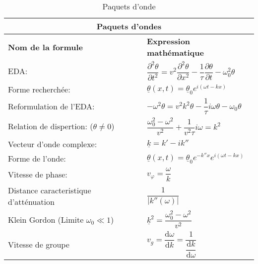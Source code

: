 \documentclass[10pt,a4paper,titlepage,portrait]{article}
\renewcommand{\d}
{
    \mathrm{d}
}
\newcommand*{\dv}[2]
{
    \dfrac{\d#1}{\d#2}
}
\newcommand*{\dpv}[2]
{
    \dfrac{\partial#1}{\partial#2}
}
\newcommand*{\ddpv}[2]
{
    \dfrac{\partial^2#1}{\partial{#2}^2}
}
\renewcommand{\arraystretch}{2}
\begin{document}
\begin{center}
\begin{table}[ht]
    \centering
    \renewcommand{\arraystretch}{1.5} %
    \setlength{\tabcolsep}{8pt} %
    \begin{tabular}{@{}p{9cm}p{10cm}@{}}
        \toprule
        \multicolumn{2}{c}{\textbf{Paquets d'ondes}} \\
        \midrule
        \textbf{Nom de la formule} & \textbf{Expression mathématique} \\
        \midrule
        EDA: & $\ddpv{\theta}{t}=v^2\ddpv{\theta}{x}-\dfrac{1}{\tau}\dpv{\theta}{t}-\omega_0^2\theta$ \\
        Forme recherchée: & $\underline{\theta}(x,t)=\underline{\theta}_0e^{i(\omega t-kx)}$\\
        Reformulation de l'EDA: & $-\omega^2\theta=v^2k^2\theta-\dfrac{1}{\tau}i\omega\theta-\omega_0\theta$\\
        Relation de dispertion: ($\theta\neq0$) & $\dfrac{\omega_0^2-\omega^2}{v^2}+\dfrac{1}{v^2\tau}i\omega=k^2$\\
        Vecteur d'onde complexe: & $\underline{k}=k'-ik ''$\\
        Forme de l'onde: & $\underline{\theta}(x,t)=\underline{\theta}_0e^{-k''x}e^{i(\omega t-kx)}$\\
        Vitesse de phase: & $v_{\varphi}=\dfrac{\omega}{k}$ \\
        Distance caracteristique d'atténuation & $\dfrac{1}{|k''(\omega)|}$ \\
        Klein Gordon (Limite $\omega_0 \ll 1$) & $\underline{k}^2=\dfrac{\omega_0^2-\omega^2}{v^2}$ \\
        Vitesse de groupe & $v_g=\dv{\omega}{k}=\dfrac{1}{\dv{k}{\omega}}$ \\
    \bottomrule
\end{tabular}
\caption{Paquets d'onde}
\label{tab:packonde}
\end{table}



\end{center}
\end{document}
